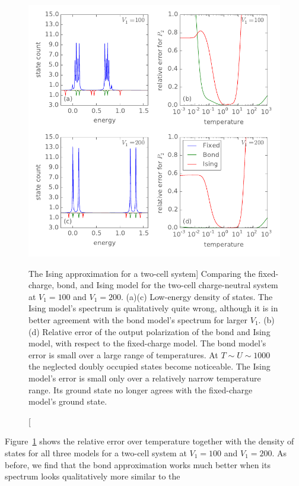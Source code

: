 %
\begin{figure}
  \center
  \includegraphics{ising_approximation2}
  \caption
  [The Ising approximation for a two-cell system]
  {
  \label{fig:ising_approximation2}
  Comparing the fixed-charge, bond, and Ising model for the two-cell
  charge-neutral  system at $V_1 = 100$ and $V_1 = 200$. (a)(c)
  Low-energy density of states. The Ising model's spectrum is qualitatively
  quite wrong, although it is in better agreement with the bond model's spectrum
  for larger $V_1$. (b)(d) Relative error of the output polarization of the bond
  and Ising model, with respect to the fixed-charge model. The bond model's
  error is small over a large range of temperatures. At $T \sim U \sim 1000$ the
  neglected doubly occupied states become noticeable. The Ising model's error is
  small only over a relatively narrow temperature range. Its ground state no
  longer agrees with the fixed-charge model's ground state.
  }
\end{figure}
%
Figure~\ref{fig:ising_approximation2} shows the relative error over temperature
together with the density of states for all three models for a two-cell system
at $V_1 = 100$ and $V_1 = 200$. As before, we find that the bond approximation
works much better when its spectrum looks qualitatively more similar to the
